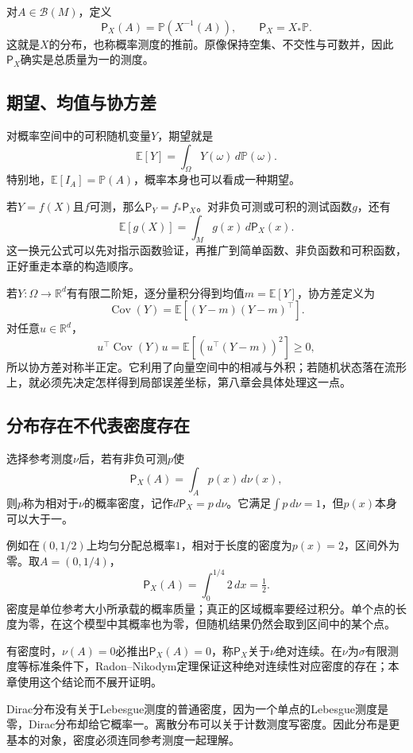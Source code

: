 对$A\in\mathcal B(M)$，定义
\[
 \boxed{\mathsf P_X(A)=\mathbb P(X^{-1}(A)),\qquad
        \mathsf P_X=X_*\mathbb P.}
\]
这就是$X$的分布，也称概率测度的推前。原像保持空集、不交性与可数并，因此$\mathsf P_X$确实是总质量为一的测度。

\subsection{期望、均值与协方差}

对概率空间中的可积随机变量$Y$，期望就是
\[
 \mathbb E[Y]=\int_\Omega Y(\omega)\,d\mathbb P(\omega).
\]
特别地，$\mathbb E[I_A]=\mathbb P(A)$，概率本身也可以看成一种期望。

若$Y=f(X)$且$f$可测，那么$\mathsf P_Y=f_*\mathsf P_X$。对非负可测或可积的测试函数$g$，还有
\[
 \mathbb E[g(X)]=\int_Mg(x)\,d\mathsf P_X(x).
\]
这一换元公式可以先对指示函数验证，再推广到简单函数、非负函数和可积函数，正好重走本章的构造顺序。



若$Y:\Omega\to\mathbb R^d$有有限二阶矩，逐分量积分得到均值$m=\mathbb E[Y]$，协方差定义为
\[
 \operatorname{Cov}(Y)=\mathbb E[(Y-m)(Y-m)^\top].
\]
对任意$u\in\mathbb R^d$，
\[
 u^\top\operatorname{Cov}(Y)u
 =\mathbb E[(u^\top(Y-m))^2]\geq0,
\]
所以协方差对称半正定。它利用了向量空间中的相减与外积；若随机状态落在流形上，就必须先决定怎样得到局部误差坐标，第八章会具体处理这一点。

\subsection{分布存在不代表密度存在}

选择参考测度$\nu$后，若有非负可测$p$使
\[
 \mathsf P_X(A)=\int_Ap(x)\,d\nu(x),
\]
则$p$称为相对于$\nu$的概率密度，记作$d\mathsf P_X=p\,d\nu$。它满足$\int p\,d\nu=1$，但$p(x)$本身可以大于一。

例如在$(0,1/2)$上均匀分配总概率$1$，相对于长度的密度为$p(x)=2$，区间外为零。取$A=(0,1/4)$，
\[
 \mathsf P_X(A)=\int_0^{1/4}2\,dx=\tfrac12.
\]
密度是单位参考大小所承载的概率质量；真正的区域概率要经过积分。单个点的长度为零，在这个模型中其概率也为零，但随机结果仍然会取到区间中的某个点。


有密度时，$\nu(A)=0$必推出$\mathsf P_X(A)=0$，称$\mathsf P_X$关于$\nu$绝对连续。在$\nu$为$\sigma$有限测度等标准条件下，Radon--Nikodym定理保证这种绝对连续性对应密度的存在；本章使用这个结论而不展开证明。

Dirac分布没有关于Lebesgue测度的普通密度，因为一个单点的Lebesgue测度是零，Dirac分布却给它概率一。离散分布可以关于计数测度写密度。因此分布是更基本的对象，密度必须连同参考测度一起理解。

